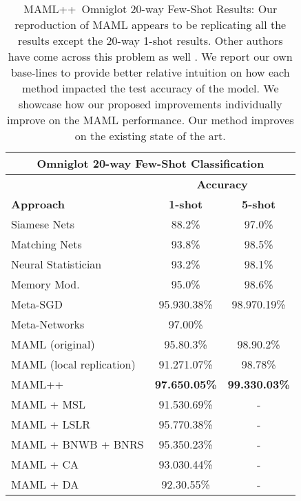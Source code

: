 \documentclass{article} \usepackage[dvipsnames]{xcolor}
\newcommand{\newmaml}{MAML++}
\begin{document}
\begin{table}[tbh]
\centering
\caption{\newmaml\ Omniglot 20-way Few-Shot Results: Our reproduction of MAML appears to be replicating all the results except the 20-way 1-shot results. Other authors have come across this problem as well \cite{jamal2018task}. We report our own base-lines to provide better relative intuition on how each method impacted the test accuracy of the model. We showcase how our proposed improvements individually improve on the MAML performance. Our method improves on the existing state of the art.}
\begin{tabular}{|l|c|c}
\hline
\multicolumn{3}{|c|}{\textbf{Omniglot 20-way Few-Shot Classification}}                  \\ \hline
                    & \multicolumn{2}{c|}{\textbf{Accuracy}}                               \\ \hline
\textbf{Approach}   & \textbf{1-shot}             & \multicolumn{1}{c|}{\textbf{5-shot}}    \\ \hline
Siamese Nets        & 88.2\%                      & \multicolumn{1}{c|}{97.0\%}             \\ \hline
Matching Nets       & 93.8\%                      & \multicolumn{1}{c|}{98.5\%}             \\ \hline
Neural Statistician & 93.2\%                      & \multicolumn{1}{c|}{98.1\%}             \\ \hline
Memory Mod.         & 95.0\%                      & \multicolumn{1}{c|}{98.6\%}             \\ \hline
Meta-SGD            & 95.930.38\%          & \multicolumn{1}{c|}{98.970.19\%} \\ \hline
Meta-Networks       & 97.00\%                     & \multicolumn{1}{c|}{}                \\ \hline
MAML (original)     & 95.80.3\%            & \multicolumn{1}{c|}{98.90.2\%}   \\ \hline
MAML (local replication)         & 91.271.07\%          & \multicolumn{1}{c|}{98.78\%}            \\ \hline
\newmaml            & \textbf{97.650.05\%} & \multicolumn{1}{c|}{\textbf{99.330.03\%}}   \\ \hline
MAML + MSL          & 91.530.69\%          & \multicolumn{1}{c|}{-}                  \\ \hline
MAML + LSLR         & 95.770.38\%          & \multicolumn{1}{c|}{-}                  \\ \hline
MAML + BNWB + BNRS  & 95.350.23\%          & \multicolumn{1}{c|}{-}                  \\ \hline
MAML + CA           & 93.030.44\%          & \multicolumn{1}{c|}{-}                  \\ \hline
MAML + DA           & 92.30.55\%           & \multicolumn{1}{c|}{-}                  \\ \hline
\end{tabular}
	\label{table:omniglot_maml++}
\end{table}
\end{document}
